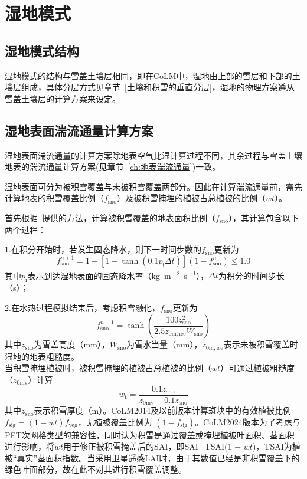 \chapter{湿地模式}

\section{湿地模式结构}
湿地模式的结构与雪盖土壤层相同，即在CoLM中，湿地由上部的雪层和下部的土壤层组成，具体分层方式见章节~\ref{土壤和积雪的垂直分层}，湿地的物理方案遵从雪盖土壤层的计算方案来设定。

\section{湿地表面湍流通量计算方案}
湿地表面湍流通量的计算方案除地表空气比湿计算过程不同，其余过程与雪盖土壤地表的湍流通量计算方案(见章节~\ref{ch:地表湍流通量})一致。

湿地表面可分为被积雪覆盖与未被积雪覆盖两部分。因此在计算湍流通量前，需先计算地表的积雪覆盖比例（$f_{\mathrm{sno}}$）及被积雪掩埋的植被占总植被的比例（$wt$）。

首先根据~\citet{swenson2012new}提供的方法，计算被积雪覆盖的地表面积比例（$f_{\mathrm{sno}}$），其计算包含以下两个过程：

1.在积分开始时，若发生固态降水，则下一时间步数的$f_{\mathrm{sno}}$更新为
\begin{equation}
  f^{n+1}_{\mathrm{sno}}=1-\left[1-\tanh{\left(0.1 p_{\mathrm {i}}  \Delta t\right)}\right]\left(1-f^n_{\mathrm{sno}}\right) \leqslant 1.0
\end{equation}
其中$p_{\mathrm {i}} $表示到达湿地表面的固态降水率（\unit{kg.m^{-2}.s^{-1}}），$\Delta t$为积分的时间步长（s）；

2.在水热过程模拟结束后，考虑积雪融化，$f_{\mathrm{sno}}$更新为
\begin{equation}
  f^{n+1}_{\mathrm{sno}}=\tanh \left(\frac{100 z^2_{\mathrm{sno}}}{2.5z_{\mathrm{0m,ice}} W_{\mathrm{sno}}}\right)
\end{equation}
其中$z_{\mathrm{sno}}$为雪盖高度（mm），$W_{\mathrm{sno}}$为雪水当量（mm），$z_{\mathrm{0m,ice}}$表示未被积雪覆盖时湿地的地表粗糙度。\\

当积雪掩埋植被时，被积雪掩埋的植被占总植被的比例（$wt$）可通过植被粗糙度（$z_{\mathrm{0mv}}$）计算
\begin{equation}
  w_{\mathrm {t}} =\frac{0.1 z_{\mathrm{sno}}}{z_{\mathrm{0mv}}+0.1 z_{\mathrm{sno}}}
\end{equation}
其中$z_{\mathrm{sno}}$表示积雪厚度（m）。CoLM2014及以前版本计算斑块中的有效植被比例$f_{\mathrm{sig}} =
(1 −wt)f_{\mathrm{veg}}$，无植被覆盖比例为 $(1−f_{\mathrm{sig}})$。CoLM2024版本为了考虑与PFT次网格类型的兼容性，同时认为积雪是通过覆盖或掩埋植被叶面积、茎面积进行影响，将$wt$用于修正被积雪掩盖后的SAI，即SAI=TSAI(1 − $wt$)，TSAI为植被“真实”茎面积指数。当采用卫星遥感LAI时，由于其数值已经是非积雪覆盖下的绿色叶面部分，故在此不对其进行积雪覆盖调整。\\

